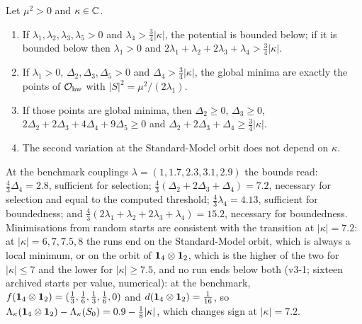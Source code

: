 \begin{theorem}
\label{thm:selectk}
Let $\mu^2>0$ and $\kappa\in\mathbb{C}$.
\begin{enumerate}[label=(\alph*),leftmargin=2.2em]
\item If $\lambda_1,\lambda_2,\lambda_3,\lambda_5>0$ and $\lambda_4>\tfrac34|\kappa|$, the potential is bounded below; if it is bounded below then $\lambda_1>0$ and
$2\lambda_1+\lambda_2+2\lambda_3+\lambda_4>\tfrac34|\kappa|$.
\item If $\lambda_1>0$, $\Delta_2,\Delta_3,\Delta_5>0$ and $\Delta_4>\tfrac34|\kappa|$, the global minima are exactly the points of $\mathcal O_{\rm hw}$ with
$|S|^2=\mu^2/(2\lambda_1)$.
\item If those points are global minima, then $\Delta_2\ge0$, $\Delta_3\ge0$, $2\Delta_2+2\Delta_3+4\Delta_4+9\Delta_5\ge0$ and
$\Delta_2+2\Delta_3+\Delta_4\ge\tfrac34|\kappa|$.
\item The second variation at the Standard-Model orbit does not depend on $\kappa$.
\end{enumerate}
\end{theorem}

At the benchmark couplings $\lambda=(1,1.7,2.3,3.1,2.9)$ the bounds read: $\tfrac43\Delta_4=2.8$, sufficient for selection; $\tfrac43(\Delta_2+2\Delta_3+\Delta_4)=7.2$,
necessary for selection and equal to the computed threshold; $\tfrac43\lambda_4=4.13$, sufficient for boundedness; and $\tfrac43(2\lambda_1+\lambda_2+2\lambda_3+\lambda_4)=15.2$,
necessary for boundedness. Minimisations from random starts are consistent with the transition at $|\kappa|=7.2$: at $|\kappa|=6,7,7.5,8$ the runs end on the
Standard-Model orbit, which is always a local minimum, or on the orbit of $\mathbf 1_4\otimes\mathbf 1_2$, which is the higher of the two for $|\kappa|\le7$ and the lower for
$|\kappa|\ge7.5$, and no run ends below both (v3-1; sixteen archived starts per value, numerical): at the benchmark,
$f(\mathbf 1_4\otimes\mathbf 1_2)=(\tfrac13,\tfrac16,\tfrac13,\tfrac16,0)$ and $d(\mathbf 1_4\otimes\mathbf 1_2)=\tfrac1{16}$, so
$\Lambda_\kappa(\mathbf 1_4\otimes\mathbf 1_2)-\Lambda_\kappa(S_0)=0.9-\tfrac18|\kappa|$, which changes sign at $|\kappa|=7.2$.

